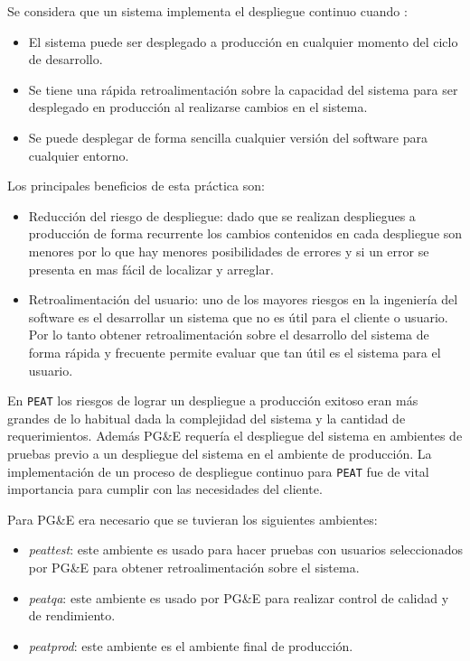 \vspace{2.5mm}

Se considera que un sistema implementa el despliegue continuo cuando
\cite{27_martin_fowler_cd}:
\begin{itemize}
\item El sistema puede ser desplegado a producción en cualquier momento del
  ciclo de desarrollo.
\item Se tiene una rápida retroalimentación sobre la capacidad del sistema
  para ser desplegado en producción al realizarse cambios en el sistema.
\item Se puede desplegar de forma sencilla cualquier versión del software para
  cualquier entorno.
\end{itemize}

Los principales beneficios de esta práctica son:
\begin{itemize}
\item Reducción del riesgo de despliegue: dado que se realizan despliegues
  a producción de forma recurrente los cambios contenidos en cada despliegue
  son menores por lo que hay menores posibilidades de errores y si un error
  se presenta en mas fácil de localizar y arreglar.
\item Retroalimentación del usuario: uno de los mayores riesgos en la ingeniería
  del software es el desarrollar un sistema que no es útil para el cliente o usuario.
  Por lo tanto obtener retroalimentación sobre el desarrollo del sistema de forma
  rápida y frecuente permite evaluar que tan útil es el sistema para el usuario.
\end{itemize}

En \texttt{PEAT} los riesgos de lograr un despliegue a producción exitoso
eran más grandes de lo habitual dada la complejidad del sistema y la cantidad
de requerimientos. Además PG\&E requería el despliegue del sistema en ambientes
de pruebas previo a un despliegue del sistema en el ambiente de producción.
La implementación de un proceso de despliegue continuo para \texttt{PEAT} fue de
vital importancia para cumplir con las necesidades del cliente.

\vspace{2.5mm}

Para PG\&E era necesario que se tuvieran los siguientes ambientes:
\begin{itemize}
\item \textit{peattest}: este ambiente es usado para hacer pruebas con usuarios
  seleccionados por PG\&E para obtener retroalimentación sobre el sistema.
\item \textit{peatqa}: este ambiente es usado por PG\&E para realizar control de
  calidad y de rendimiento.
\item \textit{peatprod}: este ambiente es el ambiente final de producción.
\end{itemize}

